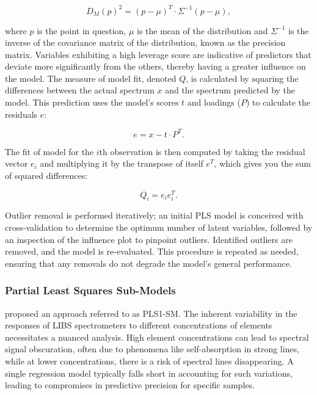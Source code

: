 \begin{equation}
    D_M(p)^2 = (p - \mu)^T \cdot \Sigma^{-1} (p - \mu),
\end{equation}

where $p$ is the point in question, $\mu$ is the mean of the distribution and $\Sigma^{-1}$ is the inverse of the covariance matrix of the distribution, known as the precision matrix.
Variables exhibiting a high leverage score are indicative of predictors that deviate more significantly from the others, thereby having a greater influence on the model.
The measure of model fit, denoted $Q$, is calculated by squaring the differences between the actual spectrum $x$ and the spectrum predicted by the model. This prediction uses the model's scores $t$ and loadings ($P$) to calculate the residuals $e$:

\begin{equation}
    e = x - t \cdot P^T.
\end{equation}

The fit of model for the $i$th observation is then computed by taking the residual vector $e_i$ and multiplying it by the transpose of itself $e^T$, which gives you the sum of squared differences\cite{marini_chemometrics_2013, andersonImprovedAccuracyQuantitative2017}:

\begin{equation}
    Q_i = e_{i}e_{i}^T.
\end{equation} 

Outlier removal is performed iteratively; an initial PLS model is conceived with cross-validation to determine the optimum number of latent variables, followed by an inspection of the influence plot to pinpoint outliers. Identified outliers are removed, and the model is re-evaluated. This procedure is repeated as needed, ensuring that any removals do not degrade the model's general performance.


\subsubsection{Partial Least Squares Sub-Models}\label{sec:pls_sub-models}

\citet{andersonImprovedAccuracyQuantitative2017} proposed an approach referred to as PLS1-SM.
The inherent variability in the responses of LIBS spectrometers to different concentrations of elements necessitates a nuanced analysis.
    High element concentrations can lead to spectral signal obscuration, often due to phenomena like self-absorption in strong lines, while at lower concentrations, there is a risk of spectral lines disappearing.
A single regression model typically falls short in accounting for such variations, leading to compromises in predictive precision for specific samples.


